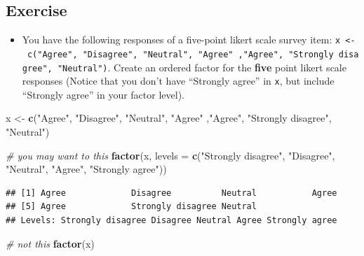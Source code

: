 \documentclass[]{book}
\newenvironment{Shaded}{\begin{snugshade}}{\end{snugshade}}
\newcommand{\CommentTok}[1]{\textcolor[rgb]{0.56,0.35,0.01}{\textit{#1}}}
\newcommand{\DataTypeTok}[1]{\textcolor[rgb]{0.13,0.29,0.53}{#1}}
\newcommand{\KeywordTok}[1]{\textcolor[rgb]{0.13,0.29,0.53}{\textbf{#1}}}
\newcommand{\NormalTok}[1]{#1}
\newcommand{\StringTok}[1]{\textcolor[rgb]{0.31,0.60,0.02}{#1}}
\providecommand{\tightlist}{%
  \setlength{\itemsep}{0pt}\setlength{\parskip}{0pt}}
\begin{document}
\hypertarget{exercise-1}{%
\subsection{Exercise}\label{exercise-1}}

\begin{itemize}
\tightlist
\item
  You have the following responses of a five-point likert scale survey item: \texttt{x\ \textless{}-\ c("Agree",\ "Disagree",\ "Neutral",\ "Agree"\ ,"Agree",\ "Strongly\ disagree",\ "Neutral")}. Create an ordered factor for the \textbf{five} point likert scale responses (Notice that you don't have ``Strongly agree'' in \texttt{x}, but include ``Strongly agree'' in your factor level).
\end{itemize}

\begin{Shaded}
\begin{Highlighting}[]
\NormalTok{x <-}\StringTok{ }\KeywordTok{c}\NormalTok{(}\StringTok{"Agree"}\NormalTok{, }\StringTok{"Disagree"}\NormalTok{, }\StringTok{"Neutral"}\NormalTok{, }\StringTok{"Agree"}\NormalTok{ ,}\StringTok{"Agree"}\NormalTok{, }\StringTok{"Strongly disagree"}\NormalTok{, }\StringTok{"Neutral"}\NormalTok{)}
\end{Highlighting}
\end{Shaded}

\begin{Shaded}
\begin{Highlighting}[]
\CommentTok{# you may want to this}
\KeywordTok{factor}\NormalTok{(x, }\DataTypeTok{levels =} \KeywordTok{c}\NormalTok{(}\StringTok{"Strongly disagree"}\NormalTok{, }\StringTok{"Disagree"}\NormalTok{, }\StringTok{"Neutral"}\NormalTok{,  }\StringTok{"Agree"}\NormalTok{, }\StringTok{"Strongly agree"}\NormalTok{))}
\end{Highlighting}
\end{Shaded}

\begin{verbatim}
## [1] Agree             Disagree          Neutral           Agree            
## [5] Agree             Strongly disagree Neutral          
## Levels: Strongly disagree Disagree Neutral Agree Strongly agree
\end{verbatim}

\begin{Shaded}
\begin{Highlighting}[]
\CommentTok{# not this}
\KeywordTok{factor}\NormalTok{(x)}
\end{Highlighting}
\end{Shaded}
\end{document}
